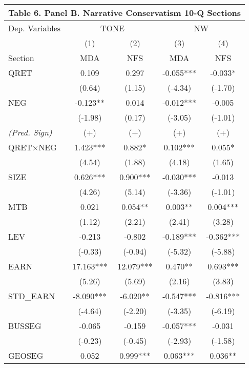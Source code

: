 \begin{table}[H] \label{T6PB}%
	\begin{center}
		\begin{tabular}{lcccc}
			\multicolumn{5}{c}{\textbf{Table 6. Panel B. Narrative Conservatism 10-Q Sections}} \\
			\midrule
			\midrule
			Dep. Variables & \multicolumn{2}{c}{TONE} & \multicolumn{2}{c}{NW} \\
			\cmidrule{2-5}
			& (1) & (2) & (3) & (4) \\
			Section & MDA & NFS & MDA & NFS \\
			\midrule
			QRET & 0.109 & 0.297 & -0.055*** & -0.033* \\
			& (0.64) & (1.15) & (-4.34) & (-1.70) \\
			NEG & -0.123** & 0.014 & -0.012*** & -0.005 \\
			& (-1.98) & (0.17) & (-3.05) & (-1.01) \\
			\rowcolor[rgb]{ .906,  .902,  .902} \textit{(Pred. Sign)} & (+) & (+) & (+) & (+) \\
			\rowcolor[rgb]{ .906,  .902,  .902} QRET$\times$NEG & 1.423*** & 0.882* & 0.102*** & 0.055* \\
			\rowcolor[rgb]{ .906,  .902,  .902} & (4.54) & (1.88) & (4.18) & (1.65) \\
			SIZE & 0.626*** & 0.900*** & -0.030*** & -0.013 \\
			& (4.26) & (5.14) & (-3.36) & (-1.01) \\
			MTB & 0.021 & 0.054** & 0.003** & 0.004*** \\
			& (1.12) & (2.21) & (2.41) & (3.28) \\
			LEV & -0.213 & -0.802 & -0.189*** & -0.362*** \\
			& (-0.33) & (-0.94) & (-5.32) & (-5.88) \\
			EARN & 17.163*** & 12.079*** & 0.470** & 0.693*** \\
			& (5.26) & (5.69) & (2.16) & (3.83) \\
			STD\_EARN & -8.090*** & -6.020** & -0.547*** & -0.816*** \\
			& (-4.64) & (-2.20) & (-3.35) & (-6.19) \\
			BUSSEG & -0.065 & -0.159 & -0.057*** & -0.031 \\
			& (-0.23) & (-0.45) & (-2.93) & (-1.58) \\
			GEOSEG & 0.052 & 0.999*** & 0.063*** & 0.036** \\

\end{tabular}
\end{center}
\end{table}
